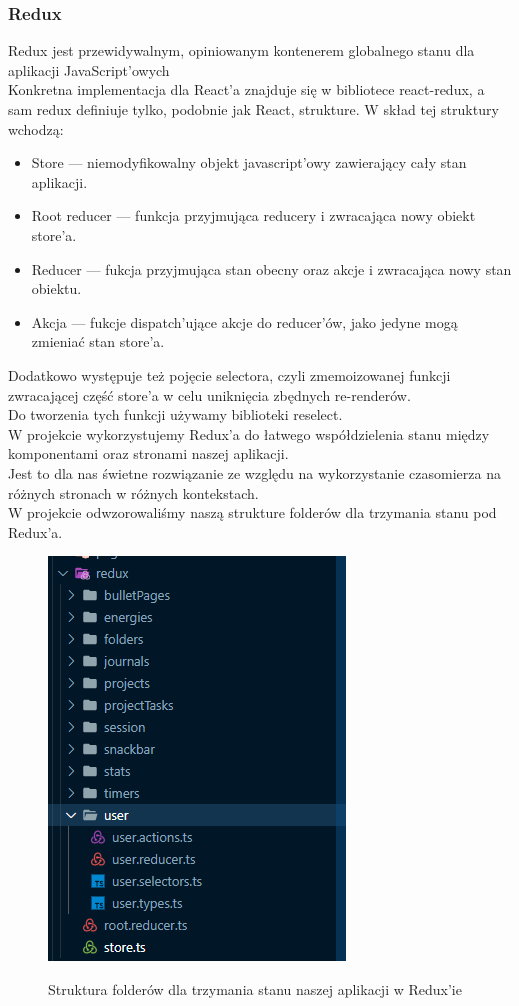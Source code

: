 \documentclass[a4paper,11pt]{report}
\begin{document}
\subsubsection{Redux}
Redux\cite{redux} jest przewidywalnym, opiniowanym kontenerem globalnego stanu dla aplikacji JavaScript'owych\\
Konkretna implementacja dla React'a znajduje się w bibliotece react-redux\cite{react-redux},
 a sam redux definiuje tylko, podobnie jak React, strukture.
W skład tej struktury wchodzą:
\begin{itemize}
	\item Store — niemodyfikowalny objekt javascript'owy zawierający cały stan aplikacji.
	\item Root reducer — funkcja przyjmująca reducery i zwracająca nowy obiekt store'a.
	\item Reducer — fukcja przyjmująca stan obecny oraz akcje i zwracająca nowy stan obiektu.
	\item Akcja — fukcje dispatch'ujące akcje do reducer'ów, jako jedyne mogą zmieniać stan store'a.
\end{itemize}
Dodatkowo występuje też pojęcie selectora, czyli zmemoizowanej funkcji zwracającej część store'a w celu uniknięcia zbędnych re-renderów.\\
Do tworzenia tych funkcji używamy biblioteki reselect\cite{reselect}.\\
W projekcie wykorzystujemy Redux'a do łatwego współdzielenia stanu między komponentami oraz stronami naszej aplikacji.\\
Jest to dla nas świetne rozwiązanie ze względu na wykorzystanie czasomierza na różnych stronach w różnych kontekstach.\\
W projekcie odwzorowaliśmy naszą strukture folderów dla trzymania stanu pod Redux'a.
\begin{figure}[H]
	\centering
	\includegraphics[scale=0.5]{implementacja/frontend/struktura_redux}\\
	\caption{Struktura folderów dla trzymania stanu naszej aplikacji w Redux'ie}
	\label{fig:struktura_redux}
\end{figure}
\end{document}
